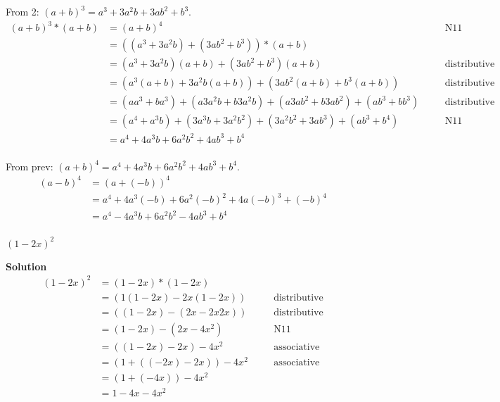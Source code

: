 From 2: ${(a + b)}^3 = a^3 + 3 a^2 b + 3ab^2 + b^3$.
\begin{align*}
{(a + b)}^3 * (a + b) &= {(a + b)}^4 && \quad \text{N11} \\
&= ((a^3 + 3 a^2 b) + (3ab^2 + b^3)) * (a + b) && \quad \text{} \\
&= (a^3 + 3 a^2 b)(a + b) + (3ab^2 + b^3)(a + b) && \quad \text{distributive} \\
&= (a^3(a + b) + 3 a^2 b(a + b)) + (3ab^2(a + b) + b^3(a + b)) && \quad \text{distributive} \\
&= (a a^3 + b a^3) + (a 3 a^2 b + b 3 a^2 b) + (a 3ab^2 + b 3ab^2) + (a b^3 + b b^3) && \quad \text{distributive} \\
&= (a^4 + a^3 b) + (3 a^3 b + 3 a^2 b^2) + (3 a^2 b^2 + 3 a b^3) + (a b^3 + b^4) && \quad \text{N11} \\
&= a^4 + 4 a^3 b + 6 a^2 b^2 + 4 a b^3 + b^4 && \quad \text{} \\
\end{align*}

From prev: ${(a + b)}^4 = a^4 + 4 a^3 b + 6 a^2 b^2 + 4 a b^3 + b^4$.
\begin{align*}
{(a-b)}^4 &= {(a + (-b))}^4 \\
&= a^4 + 4 a^3 (-b) + 6 a^2 {(-b)}^2 + 4 a {(-b)}^3 + {(-b)}^4 \\
&= a^4 - 4 a^3 b + 6 a^2 b^2 - 4 a b^3 + b^4 \\
\end{align*}

\begin{tcolorbox}[title=Problem 5, breakable]
${(1 - 2 x)}^2$
\end{tcolorbox}

\textbf{Solution}
\begin{align*}
{(1 - 2 x)}^2 &= (1 - 2 x) * (1 - 2 x) && \\
&= (1(1 - 2 x) - 2 x(1 - 2 x)) && \quad \text{distributive} \\
&= ((1 - 2 x) - (2x - 2 x 2 x)) && \quad \text{distributive} \\
&= (1 - 2 x) - (2x - 4 x^2) && \quad \text{N11} \\
&= ((1 - 2 x) - 2x) - 4 x^2 && \quad \text{associative} \\
&= (1 + ((- 2 x) - 2x)) - 4 x^2 && \quad \text{associative} \\
&= (1 + (-4x)) - 4 x^2 && \quad \text{} \\
&= 1 - 4x - 4 x^2 && \quad \text{} \\
\end{align*}

